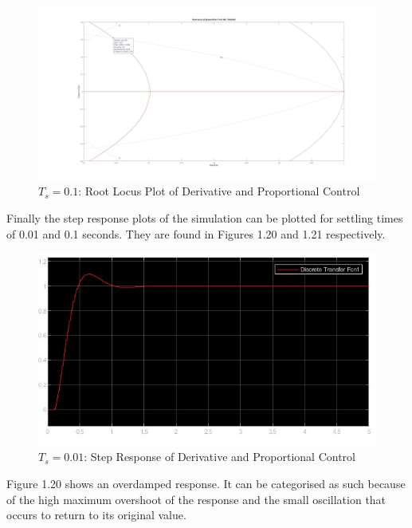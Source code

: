 \documentclass[stu, a4paper, 12pt, floatsintext]{apa7}
\numberwithin{figure}{section}
\numberwithin{table}{section}
\numberwithin{equation}{section}
\begin{document}
\begin{figure}[H]
    \caption{$T_s = 0.1$: Root Locus Plot of Derivative and Proportional Control}
    \label{fig:0.1_Ts_step3_root_locus}
    \centering
    \includegraphics[width=1.1\textwidth]{pictures/task3_0.1.jpg}
\end{figure}
Finally the step response plots of the simulation can be plotted for settling times of 0.01 and 0.1 seconds. They are found in Figures 1.20 and 1.21 respectively.
\begin{figure}[H]
    \caption{$T_s = 0.01$: Step Response of Derivative and Proportional Control}
    \label{fig:0.01_Ts_step3_step_response}
    \centering
    \includegraphics[width=1.1\textwidth]{pictures/task3_0.01_step_response.jpg}
\end{figure}
Figure 1.20 shows an overdamped response. It can be categorised as such because of the high maximum overshoot of the response and the small oscillation that occurs to return to its original value.
\end{document}
